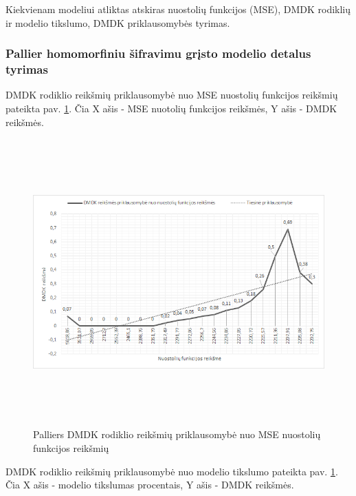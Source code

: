 \documentclass{VUMIFInfBakalaurinis}
\begin{document}
\par Kiekvienam modeliui atliktas atskiras nuostolių funkcijos (MSE), DMDK rodiklių ir modelio tikslumo, DMDK priklausomybės tyrimas.

\subsubsection{Pallier homomorfiniu šifravimu grįsto modelio detalus tyrimas}
\par DMDK rodiklio reikšmių priklausomybė nuo MSE nuostolių funkcijos reikšmių pateikta pav. \ref{fig:Palliers DMDK rodiklio reikšmių priklausomybė nuo MSE nuostolių funkcijos reikšmių}. Čia X ašis - MSE nuotolių funkcijos reikšmės, Y ašis - DMDK reikšmės. 

\begin{figure}[h]
  \centering
  \includegraphics[width=14cm,height=11cm,keepaspectratio]{img/pal_tyr_1.png}
  \caption{Palliers DMDK rodiklio reikšmių priklausomybė nuo MSE nuostolių funkcijos reikšmių}
  \label{fig:Palliers DMDK rodiklio reikšmių priklausomybė nuo MSE nuostolių funkcijos reikšmių}
\end{figure}

\par DMDK rodiklio reikšmių priklausomybė nuo modelio tikslumo pateikta pav. \ref{fig:Palliers DMDK rodiklio reikšmių priklausomybė nuo MSE nuostolių funkcijos reikšmių}. Čia X ašis - modelio tikslumas procentais, Y ašis - DMDK reikšmės.
\end{document}
